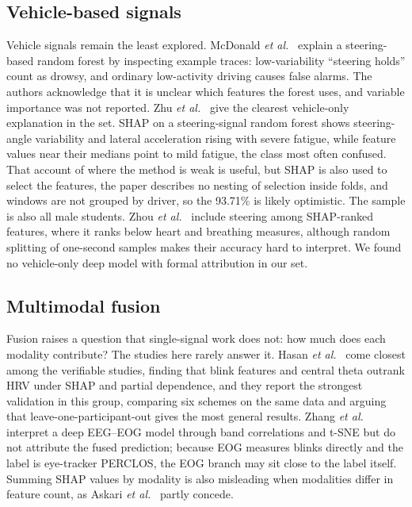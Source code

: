 \subsection{Vehicle-based signals}
Vehicle signals remain the least explored. McDonald \textit{et al.}~\cite{mcdonald2014steering} explain a steering-based random forest by inspecting example traces: low-variability ``steering holds'' count as drowsy, and ordinary low-activity driving causes false alarms. The authors acknowledge that it is unclear which features the forest uses, and variable importance was not reported. Zhu \textit{et al.}~\cite{zhu2025madfm} give the clearest vehicle-only explanation in the set. SHAP on a steering-signal random forest shows steering-angle variability and lateral acceleration rising with severe fatigue, while feature values near their medians point to mild fatigue, the class most often confused. That account of where the method is weak is useful, but SHAP is also used to select the features, the paper describes no nesting of selection inside folds, and windows are not grouped by driver, so the 93.71\% is likely optimistic. The sample is also all male students. Zhou \textit{et al.}~\cite{zhou2021predicting} include steering among SHAP-ranked features, where it ranks below heart and breathing measures, although random splitting of one-second samples makes their accuracy hard to interpret. We found no vehicle-only deep model with formal attribution in our set.

\subsection{Multimodal fusion}
Fusion raises a question that single-signal work does not: how much does each modality contribute? The studies here rarely answer it. Hasan \textit{et al.}~\cite{hasan2024validation} come closest among the verifiable studies, finding that blink features and central theta outrank HRV under SHAP and partial dependence, and they report the strongest validation in this group, comparing six schemes on the same data and arguing that leave-one-participant-out gives the most general results. Zhang \textit{et al.}~\cite{zhang2024multimodal} interpret a deep EEG--EOG model through band correlations and t-SNE but do not attribute the fused prediction; because EOG measures blinks directly and the label is eye-tracker PERCLOS, the EOG branch may sit close to the label itself. Summing SHAP values by modality is also misleading when modalities differ in feature count, as Askari \textit{et al.}~\cite{askari2026physiologically} partly concede.

